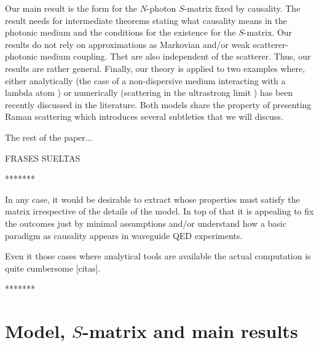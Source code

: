 \documentclass[notitlepage, prx, preprint, amsmath,superscriptaddress,amssymb]{revtex4-1}
\begin{document}
Our main result is the form for  the $N$-photon $S$-matrix  fixed by causality.   The result needs for intermediate  theorems stating what causality means  in the photonic medium  and the conditions for the existence for the $S$-matrix.  Our results do not rely on  approximations as Markovian and/or weak scatterer-photonic medium coupling. Thet are also independent of the scatterer.   Thus, our results are rather general.    
Finally, our theory is applied to  two examples where, either analytically (the case of  a non-dispersive medium interacting with a lambda atom \cite{Xu2016}) or numerically (scattering in the ultrastrong limit \cite{Sanchez-Burillo2014, Sanchez-Burillo2015}) has been recently discussed in the literature.   Both models share the property of  presenting Raman scattering which introduces several subtleties that we will discuss. 


The rest of the paper...


FRASES SUELTAS

*******

In any case, it would be desirable to extract whose properties must satisfy the matrix irrespective of the details of the model.   In top of that it is appealing to fix the outcomes just by minimal assumptions and/or understand how a basic paradigm as causality appears in waveguide QED experiments.  

Even it those cases where analytical tools are available the actual computation is quite cumbersome [citas]. 

*******

\section{Model, $S$-matrix and main results} 
\end{document}
